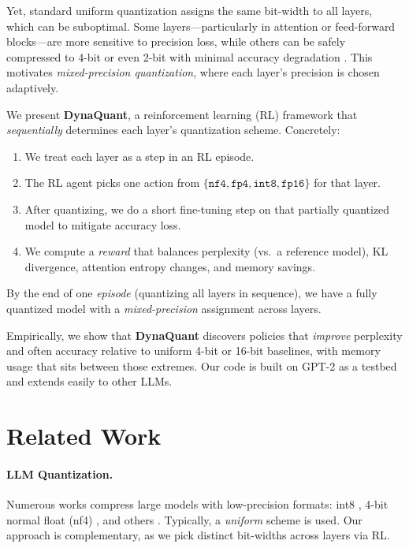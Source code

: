 \documentclass{article}
\begin{document}
	Yet, standard uniform quantization assigns the same bit-width to all layers, which can be suboptimal. Some layers—particularly in attention or feed-forward blocks—are more sensitive to precision loss, while others can be safely compressed to 4-bit or even 2-bit with minimal accuracy degradation \cite{dong2019hawq,dettmers2023qlora}. This motivates \emph{mixed-precision quantization}, where each layer’s precision is chosen adaptively.
	
	We present \textbf{DynaQuant}, a reinforcement learning (RL) framework that \emph{sequentially} determines each layer’s quantization scheme. Concretely:
	\begin{enumerate}
		\item We treat each layer as a step in an RL episode.
		\item The RL agent picks one action from $\{\texttt{nf4}, \texttt{fp4}, \texttt{int8}, \texttt{fp16}\}$ for that layer.
		\item After quantizing, we do a short fine-tuning step on that partially quantized model to mitigate accuracy loss.
		\item We compute a \emph{reward} that balances perplexity (vs.\ a reference model), KL divergence, attention entropy changes, and memory savings.
	\end{enumerate}
	By the end of one \emph{episode} (quantizing all layers in sequence), we have a fully quantized model with a \emph{mixed-precision} assignment across layers.
	
	Empirically, we show that \textbf{DynaQuant} discovers policies that \emph{improve} perplexity and often accuracy relative to uniform 4-bit or 16-bit baselines, with memory usage that sits between those extremes. Our code is built on GPT-2 as a testbed and extends easily to other LLMs.
	
	\section{Related Work}
	\label{sec:related}
	\paragraph{LLM Quantization.}
	Numerous works compress large models with low-precision formats: int8 \cite{dettmers2022llmint8}, 4-bit normal float (nf4) \cite{frantar2022gptq}, and others \cite{malinovskii2024pvtuning}. Typically, a \emph{uniform} scheme is used. Our approach is complementary, as we pick distinct bit-widths across layers via RL.
	
\end{document}
